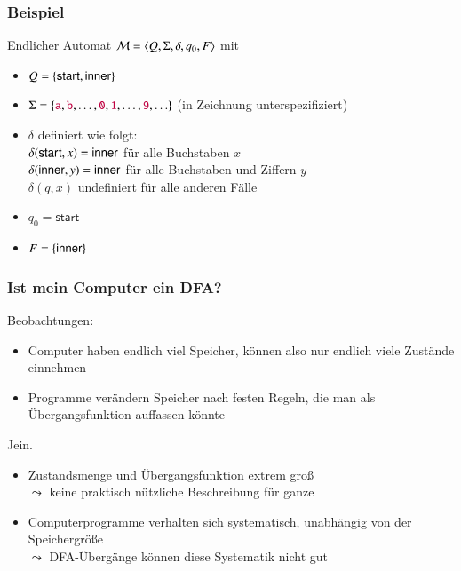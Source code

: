 \documentclass[onlymath]{beamer}
\begin{document}
\begin{frame}\frametitle{Beispiel}


Endlicher Automat $\mathcal{M}=\langle{Q,\Sigma,\delta,q_0,F}\rangle$ mit 
\begin{itemize}
\item $Q=\{ \textsf{start},\allowbreak\textsf{inner}\}$
\item $\Sigma=\{\mathtt{\textcolor{purple}{a}},\mathtt{\textcolor{purple}{b}},\ldots,\mathtt{\textcolor{purple}{0}},\mathtt{\textcolor{purple}{1}},\ldots,\mathtt{\textcolor{purple}{9}},\ldots\}$ (in Zeichnung unterspezifiziert)
\item $\delta$ definiert wie folgt:\\
	$\delta(\textsf{start},x)=\textsf{inner}$ für alle Buchstaben $x$\\
	$\delta(\textsf{inner},y)=\textsf{inner}$ für alle Buchstaben und Ziffern $y$\\
	$\delta(q,x)$ undefiniert für alle anderen Fälle
\item $q_0= \textsf{start}$
\item $F=\{\textsf{inner}\}$
\end{itemize}


\end{frame}

\begin{frame}\frametitle{Ist mein Computer ein DFA?}

Beobachtungen:
\begin{itemize}
\item Computer haben endlich viel Speicher, können also nur endlich viele Zustände einnehmen
\item Programme verändern Speicher nach festen Regeln, die man als Übergangsfunktion auffassen könnte
\end{itemize}

\pause

\bigskip
Jein.
\begin{itemize}
\item Zustandsmenge und Übergangsfunktion extrem groß\\
$\leadsto$ keine praktisch nützliche Beschreibung für ganze 
\item Computerprogramme verhalten sich systematisch, unabhängig von der Speichergröße\\
$\leadsto$ DFA-Übergänge können diese Systematik nicht gut 
\end{itemize}

\end{frame}
\end{document}
